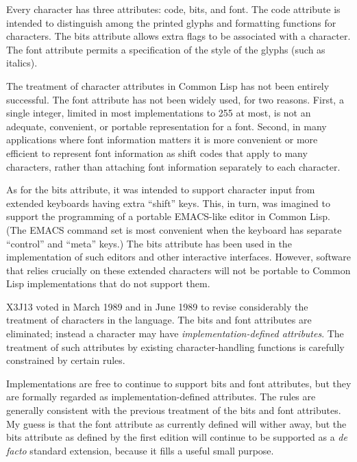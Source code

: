 Every character has three attributes: code, bits, and font.
The code attribute is intended to distinguish among the printed glyphs
and formatting functions for characters.  The bits attribute allows extra
flags to be associated with a character.  The font attribute permits
a specification of the style of the glyphs (such as italics).

\begin{new}
The treatment of character attributes in Common Lisp has not been
entirely successful.  The font attribute has not been widely used,
for two reasons.  First, a single integer, limited in most
implementations to 255 at most, is not an adequate, convenient, or portable
representation for a font.  Second, in many applications where font
information matters it is more convenient or more efficient to represent
font information as shift codes that apply to many characters, rather than
attaching font information separately to each character.

As for the bits attribute, it was intended to support
character input from extended keyboards having extra ``shift'' keys.
This, in turn, was imagined to support the programming of a portable
EMACS-like editor in Common Lisp.  (The EMACS command set
is most convenient when the keyboard has separate ``control'' and
``meta'' keys.)   The bits attribute has been used in the implementation
of such editors and other interactive interfaces.  However, software
that relies crucially on these extended characters will not be portable
to Common Lisp implementations that do not support them.

X3J13 voted in March 1989 
and in June 1989 
to revise considerably the treatment
of characters in the language.  The bits and font attributes are eliminated;
instead a character may have {\it implementation-defined attributes}.
The treatment of such attributes by existing character-handling functions
is carefully constrained by certain rules.

Implementations are free to
continue to support bits and font attributes, but they are
formally regarded as implementation-defined attributes.
The rules are generally consistent with the previous
treatment of the bits and font attributes.
My guess is that
the font attribute as currently defined will wither away,
but the bits attribute as defined by the first edition will
continue to be supported as a {\it de facto} standard extension,
because it fills a useful small purpose.
\end{new}

